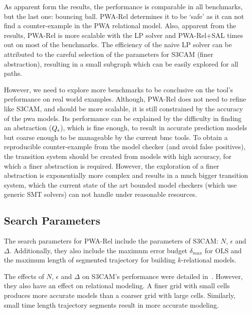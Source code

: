 
As apparent form the results, the performance is comparable in all
benchmarks, but the last one: bouncing ball. PWA-Rel determines it to
be `safe' as it can not find a counter-example in the PWA relational
model. Also, apparent from the results, PWA-Rel is more scalable with
the LP solver and PWA-Rel+SAL times out on most of the benchmarks.
The efficiency of the naive LP solver can be attributed to the careful
selection of the parameters for S3CAM (finer abstraction), resulting in
a small subgraph which can be easily explored for all paths.

However, we need to explore more benchmarks to be conclusive on the
tool's performance on real world examples. Although, PWA-Rel does not
need to refine like S3CAM, and should be more scalable, it is still
constrained by the accuracy of the pwa models. Its performance can be
explained by the difficulty in finding an abstraction
($Q_\epsilon$), which is fine enough, to result in accurate
prediction models but coarse enough to be manageable by the current
bmc tools.  To obtain a reproducible counter-example from the model
checker (and avoid false positives), the transition system should be
created from models with high accuracy, for which a finer abstraction
is required.  However, the exploration of a finer abstraction is
exponentially more complex and results in a much bigger transition
system, which the current state of the art bounded model checkers
(which use generic SMT solvers) can not handle under reasonable
resources.

\subsection{Search Parameters}

The search parameters for PWA-Rel include the parameters of S3CAM:
$N$, $\epsilon$ and $\Delta$. Additionally, they also include the
maximum error budget $\delta_{max}$ for OLS and the maximum length of
segmented trajectory for building $k$-relational models.

The effects of $N$, $\epsilon$ and $\Delta$
on S3CAM's performance were detailed in~\cite{zutshi2014multiple}. However, they also have an effect on
relational modeling. A finer grid with small cells produces more
accurate models than a coarser grid with large cells. Similarly,
small time length trajectory segments result in more accurate
modeling.

